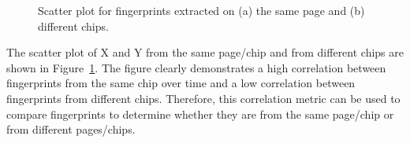 \begin{figure}
  \centering
  
  \caption{Scatter plot for fingerprints extracted on (a) the same page and (b) different chips.}
  \label{fig:fprints_scatter}
\end{figure}

The scatter plot of X and Y from the same page/chip and from different chips are shown in Figure~\ref{fig:fprints_scatter}. The figure clearly demonstrates a high correlation between fingerprints from the same chip over time and a low correlation between fingerprints from different chips. Therefore, this correlation metric can be used to compare fingerprints to determine whether they are from the same page/chip or from different pages/chips.

